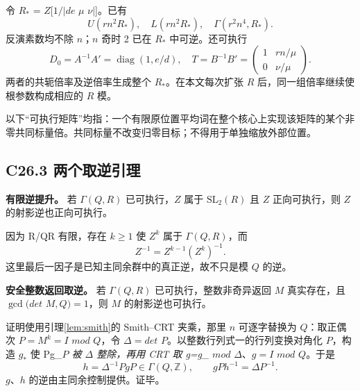 {令} {\ensuremath{R_*}} {=} {\ensuremath{Z}{[}\ensuremath{1/|de}} {\ensuremath{\mu }} {\ensuremath{\nu |}{]}。已有} \[
U(rn^2R_*),\quad L(rn^2R_*),\quad
\Gamma(r^2n^4,R_*).
\tag{C26.2.1}
\] {反演素数均不除} {\ensuremath{n}；\ensuremath{n}} {奇时} {2} {已在} {\ensuremath{R_*}} {中可逆。还可执行} \[
D_0=A^{-1}A'=\operatorname{diag}(1,e/d),\quad
T=B^{-1}B'=
\begin{pmatrix}1&rn/\mu\\0&\nu/\mu\end{pmatrix}.
\] {两者的共轭倍率及逆倍率生成整个} {\ensuremath{R_*}。在本文每次扩张} {\ensuremath{R}} {后，同一组倍率继续使根参数构成相应的} {\ensuremath{R}} {模。}

{以下``可执行矩阵''均指：一个有限原位置平均词在整个核心上实现该矩阵的某个非零共同标量倍。共同标量不改变归零目标；不得用于单独缩放外部位置。}

\subsection*{\texorpdfstring{{C26.3} {两个取逆引理}}{C26.3 两个取逆引理}}\label{C26-h159}

\textbf{{有限逆提升。}} {若} {\ensuremath{\Gamma (Q,R)}} {已可执行，\ensuremath{Z}} {属于} {\ensuremath{\mathrm{SL}_{2}(R)}} {且} {\ensuremath{Z}} {正向可执行，则} {\ensuremath{Z}} {的射影逆也正向可执行。}

{因为} {R/QR} {有限，存在} {\ensuremath{k\ge 1}} {使} {\ensuremath{Z^{k}}} {属于} {\ensuremath{\Gamma (Q,R)}，而} \[
Z^{-1}=Z^{k-1}(Z^k)^{-1}.
\tag{C26.3.1}
\] {这里最后一因子是已知主同余群中的真正逆，故不只是模} {\ensuremath{Q}} {的逆。}

\textbf{{安全整数返回取逆。}} {若} {\ensuremath{\Gamma (Q,R)}} {已可执行，整数非奇异返回} {\ensuremath{M}} {真实存在，且} {\ensuremath{\operatorname{gcd}(det}} {\ensuremath{M,Q)=1}，则} {\ensuremath{M}} {的射影逆也可执行。}

{证明使用}引理\ref{lem:smith}{的} {Smith--CRT} {夹乘，那里} {\ensuremath{n}} {可逐字替换为} {\ensuremath{Q}：取正偶次} {\ensuremath{P=M^{k}=I}} {\ensuremath{mod}} {\ensuremath{Q}，令} {\ensuremath{\Delta =det}} {\ensuremath{P}。以整数行列式一的行列变换对角化} {\ensuremath{P}，构造} {\ensuremath{g_*}} {使} {Pg\_}\emph{{\ensuremath{P}} {被} {\ensuremath{\Delta }} {整除，再用} {CRT} {取} {g=g\_}} {\ensuremath{mod}} {\ensuremath{\Delta }、\ensuremath{g=I}} {\ensuremath{mod}} {\ensuremath{Q}。于是} \[
h=\Delta^{-1}PgP\in\Gamma(Q,\mathbb Z),\qquad
gPh^{-1}=\Delta P^{-1}.
\] {\ensuremath{g}、\ensuremath{h}} {的逆由主同余控制提供。证毕。}

